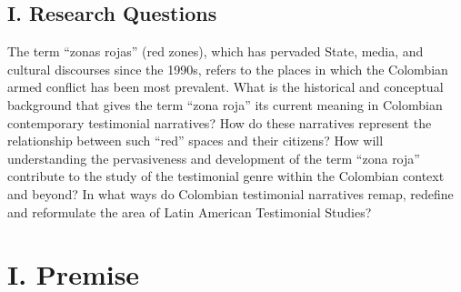 \documentclass[
  11pt,
,
onecolumn,
openany
]{book}
\begin{document}
\hypertarget{i.-research-questions}{%
\section{I. Research Questions}\label{i.-research-questions}}

The term ``zonas rojas'' (red zones), which has pervaded State, media, and
cultural discourses since the 1990s, refers to the places in which the
Colombian armed conflict has been most prevalent. What is the historical and
conceptual background that gives the term ``zona roja'' its current meaning in
Colombian contemporary testimonial narratives? How do these narratives
represent the relationship between such ``red'' spaces and their citizens? How
will understanding the pervasiveness and development of the term ``zona roja''
contribute to the study of the testimonial genre within the Colombian context
and beyond? In what ways do Colombian testimonial narratives remap, redefine
and reformulate the area of Latin American Testimonial Studies?

\hypertarget{i.-premise}{%
\chapter{I. Premise}\label{i.-premise}}
\end{document}

